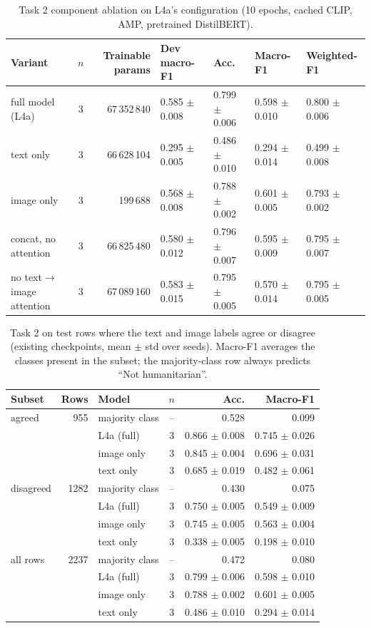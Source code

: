 \begin{table}[t]
\centering
\footnotesize
\caption{Task 2 component ablation on L4a's configuration (10 epochs, cached CLIP, AMP, pretrained DistilBERT).}
\label{tab:t2_partb}
\begin{tabular}{lcrllll}
\toprule
Variant & $n$ & Trainable params & Dev macro-F1 & Acc. & Macro-F1 & Weighted-F1 \\
\midrule
full model (L4a) & 3 & 67\,352\,840 & 0.585 $\pm$ 0.008 & 0.799 $\pm$ 0.006 & 0.598 $\pm$ 0.010 & 0.800 $\pm$ 0.006 \\
text only & 3 & 66\,628\,104 & 0.295 $\pm$ 0.005 & 0.486 $\pm$ 0.010 & 0.294 $\pm$ 0.014 & 0.499 $\pm$ 0.008 \\
image only & 3 & 199\,688 & 0.568 $\pm$ 0.008 & 0.788 $\pm$ 0.002 & 0.601 $\pm$ 0.005 & 0.793 $\pm$ 0.002 \\
concat, no attention & 3 & 66\,825\,480 & 0.580 $\pm$ 0.012 & 0.796 $\pm$ 0.007 & 0.595 $\pm$ 0.009 & 0.795 $\pm$ 0.007 \\
no text$\to$image attention & 3 & 67\,089\,160 & 0.583 $\pm$ 0.015 & 0.795 $\pm$ 0.005 & 0.570 $\pm$ 0.014 & 0.795 $\pm$ 0.005 \\
\bottomrule
\end{tabular}
\end{table}

\begin{table}[t]
\centering
\footnotesize
\caption{Task 2 on test rows where the text and image labels agree or disagree (existing checkpoints, mean $\pm$ std over seeds). Macro-F1 averages the classes present in the subset; the majority-class row always predicts ``Not humanitarian''.}
\label{tab:a1}
\begin{tabular}{lrlcrr}
\toprule
Subset & Rows & Model & $n$ & Acc. & Macro-F1 \\
\midrule
agreed & 955 & majority class & -- & 0.528 & 0.099 \\
 &  & L4a (full) & 3 & 0.866 $\pm$ 0.008 & 0.745 $\pm$ 0.026 \\
 &  & image only & 3 & 0.845 $\pm$ 0.004 & 0.696 $\pm$ 0.031 \\
 &  & text only & 3 & 0.685 $\pm$ 0.019 & 0.482 $\pm$ 0.061 \\
disagreed & 1282 & majority class & -- & 0.430 & 0.075 \\
 &  & L4a (full) & 3 & 0.750 $\pm$ 0.005 & 0.549 $\pm$ 0.009 \\
 &  & image only & 3 & 0.745 $\pm$ 0.005 & 0.563 $\pm$ 0.004 \\
 &  & text only & 3 & 0.338 $\pm$ 0.005 & 0.198 $\pm$ 0.010 \\
all rows & 2237 & majority class & -- & 0.472 & 0.080 \\
 &  & L4a (full) & 3 & 0.799 $\pm$ 0.006 & 0.598 $\pm$ 0.010 \\
 &  & image only & 3 & 0.788 $\pm$ 0.002 & 0.601 $\pm$ 0.005 \\
 &  & text only & 3 & 0.486 $\pm$ 0.010 & 0.294 $\pm$ 0.014 \\
\bottomrule
\end{tabular}
\end{table}

